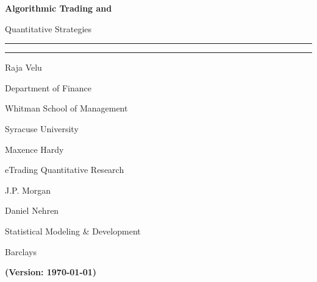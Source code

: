 {\bfseries\Huge Algorithmic Trading and \par Quantitative Strategies}

\noindent\rule{\textwidth}{0.5pt} \par
\vspace{-0.3cm}\noindent\rule{0.25\textwidth}{4pt}


\vspace{0.5cm} 
\begin{minipage}{0.3\textwidth}
\large Raja Velu \par
{\scriptsize
Department of Finance \par
Whitman School of Management \par
Syracuse University \par
}
\end{minipage}%
\begin{minipage}{0.3\textwidth}
\large Maxence Hardy \par
{\scriptsize
eTrading Quantitative Research \par
J.P. Morgan \par
}
\end{minipage}%
\begin{minipage}{0.35\textwidth}
\large Daniel Nehren \par
{\scriptsize
Statistical Modeling \& Development \par 
Barclays \par
}
\end{minipage}

\vfill
\begin{center} \Huge {\bfseries (Version: \today)} \end{center}